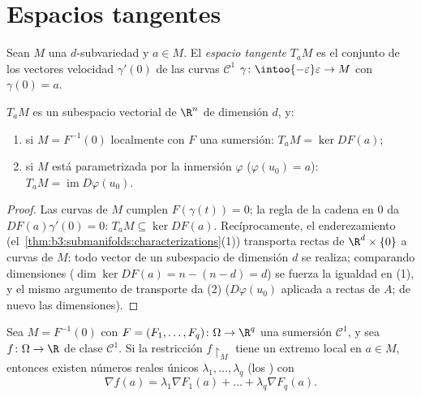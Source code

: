 \section{Espacios tangentes}

\begin{definition}\label{def:b3:submanifolds:tangent}
Sean $M$ una $d$-subvariedad y $a \in M$. El \emph{espacio
tangente} $T_aM$ es el conjunto de los vectores
velocidad $\gamma'(0)$ de las curvas $\mathcal C^1$ $\gamma \colon
\intoo{-\varepsilon}\varepsilon \to M$ con $\gamma(0) = a$.
\end{definition}

\begin{proposition}\label{prop:b3:submanifolds:tangent}
$T_aM$ es un subespacio vectorial de $\R^n$ de dimensión $d$, y:
\begin{enumerate}
  \item si $M = F^{-1}(0)$ localmente con $F$ una sumersión:
        $T_aM = \ker DF(a)$;
  \item si $M$ está parametrizada por la inmersión $\varphi$
        ($\varphi(u_0) = a$): $T_aM =
        \operatorname{im}D\varphi(u_0)$.
\end{enumerate}
\end{proposition}

\begin{proof}
Las curvas de $M$ cumplen $F(\gamma(t)) = 0$; la regla de la cadena en
$0$ da $DF(a)\gamma'(0) = 0$: $T_aM \subseteq \ker DF(a)$.
Recíprocamente, el enderezamiento
(el~\cref{thm:b3:submanifolds:characterizations}(1)) transporta rectas
de $\R^d\times\{0\}$ a curvas de $M$: todo vector de un subespacio de
dimensión $d$ se realiza; comparando dimensiones
($\dim\ker DF(a) = n - (n - d) = d$) se fuerza la igualdad en (1), y el
mismo argumento de transporte da (2) ($D\varphi(u_0)$ aplicada a rectas
de $A$; de nuevo las dimensiones).
\end{proof}

\begin{theorem}
\label{thm:b3:submanifolds:lagrange}
Sea $M = F^{-1}(0)$ con $F = (F_1, \dots, F_q) \colon \Omega
\to \R^q$ una sumersión $\mathcal C^1$, y sea $f \colon
\Omega \to \R$ de clase $\mathcal C^1$. Si la restricción
$f\restriction_M$ tiene un extremo local en $a \in M$, entonces existen
números reales únicos $\lambda_1, \dots, \lambda_q$ (los
\emph{}) con
\[
\nabla f(a) = \lambda_1\nabla F_1(a) + \dots +
\lambda_q\nabla F_q(a) .
\]
\end{theorem}

